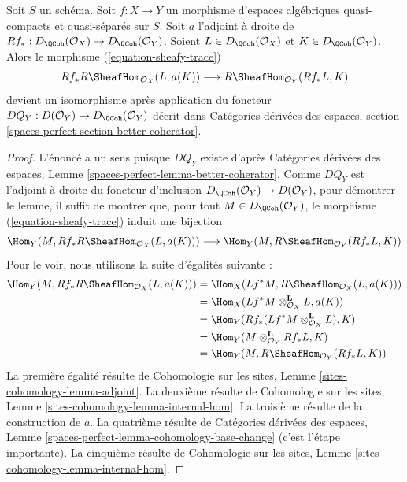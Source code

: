 \begin{lemma}
\label{lemma-iso-on-RSheafHom}
Soit $S$ un schéma.
Soit $f : X \to Y$ un morphisme d'espaces algébriques quasi-compacts et quasi-séparés
sur $S$.
Soit $a$ l'adjoint à droite de
$Rf_* : D_\QCoh(\mathcal{O}_X) \to D_\QCoh(\mathcal{O}_Y)$.
Soient $L \in D_\QCoh(\mathcal{O}_X)$ et
$K \in D_\QCoh(\mathcal{O}_Y)$.
Alors le morphisme (\ref{equation-sheafy-trace})
$$
Rf_*R\SheafHom_{\mathcal{O}_X}(L, a(K))
\longrightarrow
R\SheafHom_{\mathcal{O}_Y}(Rf_*L, K)
$$
devient un isomorphisme après application du foncteur
$DQ_Y : D(\mathcal{O}_Y) \to D_\QCoh(\mathcal{O}_Y)$
décrit dans Catégories dérivées des espaces, section
\ref{spaces-perfect-section-better-coherator}.
\end{lemma}

\begin{proof}
L'énoncé a un sens puisque $DQ_Y$ existe d'après
Catégories dérivées des espaces, Lemme
\ref{spaces-perfect-lemma-better-coherator}.
Comme $DQ_Y$ est l'adjoint à droite du foncteur d'inclusion
$D_\QCoh(\mathcal{O}_Y) \to D(\mathcal{O}_Y)$,
pour démontrer le lemme, il suffit de montrer que, pour tout
$M \in D_\QCoh(\mathcal{O}_Y)$,
le morphisme (\ref{equation-sheafy-trace}) induit une bijection
$$
\Hom_Y(M, Rf_*R\SheafHom_{\mathcal{O}_X}(L, a(K)))
\longrightarrow
\Hom_Y(M, R\SheafHom_{\mathcal{O}_Y}(Rf_*L, K))
$$
Pour le voir, nous utilisons la suite d'égalités suivante :
\begin{align*}
\Hom_Y(M, Rf_*R\SheafHom_{\mathcal{O}_X}(L, a(K)))
& =
\Hom_X(Lf^*M, R\SheafHom_{\mathcal{O}_X}(L, a(K))) \\
& =
\Hom_X(Lf^*M \otimes_{\mathcal{O}_X}^\mathbf{L} L, a(K)) \\
& =
\Hom_Y(Rf_*(Lf^*M \otimes_{\mathcal{O}_X}^\mathbf{L} L), K) \\
& =
\Hom_Y(M \otimes_{\mathcal{O}_Y}^\mathbf{L} Rf_*L, K) \\
& =
\Hom_Y(M, R\SheafHom_{\mathcal{O}_Y}(Rf_*L, K))
\end{align*}
La première égalité résulte de Cohomologie sur les sites, Lemme
\ref{sites-cohomology-lemma-adjoint}.
La deuxième résulte de Cohomologie sur les sites, Lemme
\ref{sites-cohomology-lemma-internal-hom}.
La troisième résulte de la construction de $a$.
La quatrième résulte de Catégories dérivées des espaces, Lemme
\ref{spaces-perfect-lemma-cohomology-base-change} (c'est l'étape importante).
La cinquième résulte de Cohomologie sur les sites, Lemme
\ref{sites-cohomology-lemma-internal-hom}.
\end{proof}

